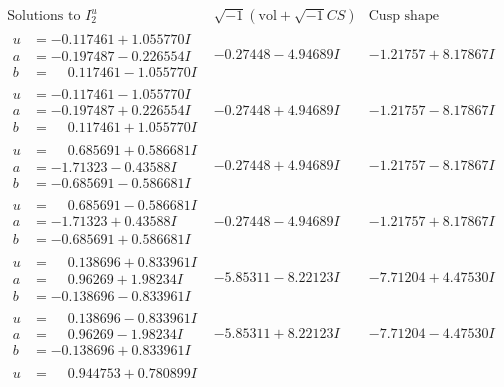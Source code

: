 \documentclass[1p]{elsarticle_modified}
\theoremstyle{definition}
\newcommand{\I}{\sqrt{-1}}
\begin{document}
$$\begin{array}{c|c|c}  
\text{Solutions to }I^u_{2}& \I (\text{vol} + \sqrt{-1}CS) & \text{Cusp shape}\\
 \hline 
\begin{aligned}
u &= -0.117461 + 1.055770 I \\
a &= -0.197487 - 0.226554 I \\
b &= \phantom{-}0.117461 - 1.055770 I\end{aligned}
 & -0.27448 - 4.94689 I & -1.21757 + 8.17867 I \\ \hline\begin{aligned}
u &= -0.117461 - 1.055770 I \\
a &= -0.197487 + 0.226554 I \\
b &= \phantom{-}0.117461 + 1.055770 I\end{aligned}
 & -0.27448 + 4.94689 I & -1.21757 - 8.17867 I \\ \hline\begin{aligned}
u &= \phantom{-}0.685691 + 0.586681 I \\
a &= -1.71323 - 0.43588 I \\
b &= -0.685691 - 0.586681 I\end{aligned}
 & -0.27448 + 4.94689 I & -1.21757 - 8.17867 I \\ \hline\begin{aligned}
u &= \phantom{-}0.685691 - 0.586681 I \\
a &= -1.71323 + 0.43588 I \\
b &= -0.685691 + 0.586681 I\end{aligned}
 & -0.27448 - 4.94689 I & -1.21757 + 8.17867 I \\ \hline\begin{aligned}
u &= \phantom{-}0.138696 + 0.833961 I \\
a &= \phantom{-}0.96269 + 1.98234 I \\
b &= -0.138696 - 0.833961 I\end{aligned}
 & -5.85311 - 8.22123 I & -7.71204 + 4.47530 I \\ \hline\begin{aligned}
u &= \phantom{-}0.138696 - 0.833961 I \\
a &= \phantom{-}0.96269 - 1.98234 I \\
b &= -0.138696 + 0.833961 I\end{aligned}
 & -5.85311 + 8.22123 I & -7.71204 - 4.47530 I \\ \hline\begin{aligned}
u &= \phantom{-}0.944753 + 0.780899 I \\

\end{aligned}
\end{array}$$
\end{document}

